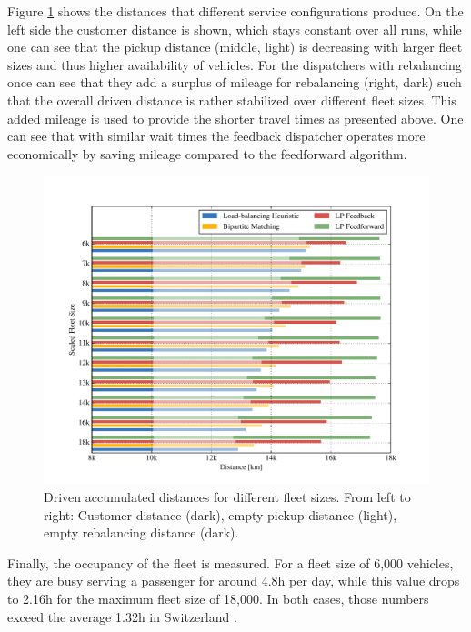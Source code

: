 
Figure \ref{fig:distances} shows the distances that different service configurations
produce. On the left side the customer distance is shown, which stays constant
over all runs, while one can see that the pickup distance (middle, light) is decreasing
with larger fleet sizes and thus higher availability of vehicles. For the dispatchers
with rebalancing once can see that they add a surplus of mileage for rebalancing (right, dark)
such that the overall driven distance is rather stabilized over different fleet sizes.
This added mileage is used to provide the shorter travel times as presented above.
One can see that with similar wait times the feedback dispatcher operates more economically
by saving mileage compared to the feedforward algorithm.

\begin{figure}
\includegraphics[width=1.0\textwidth]{figures/distances.pdf}
\caption{Driven accumulated distances for different fleet sizes. From left to right:
Customer distance (dark), empty pickup distance (light), empty rebalancing distance (dark).}
\label{fig:distances}
\end{figure}

Finally, the occupancy of the fleet is measured. For a fleet size of 6,000
vehicles, they are busy serving a passenger for around 4.8h per day, while
this value drops to 2.16h for the maximum fleet size of 18,000. In both cases,
those numbers exceed the average 1.32h in Switzerland \cite{Bosch2016a}.

